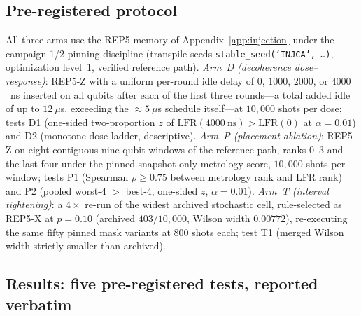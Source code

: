 \documentclass[pdflatex,sn-mathphys-num]{sn-jnl}
\theoremstyle{thmstyleone}
\theoremstyle{thmstyletwo}
\theoremstyle{thmstylethree}
\begin{document}
\subsection{Pre-registered protocol}

All three arms use the REP5 memory of Appendix~\ref{app:injection} under the campaign-1/2 pinning discipline (transpile seeds \texttt{stable\_seed(`INJCA',\,\ldots)}, optimization level~1, verified reference path). \emph{Arm~D (decoherence dose--response)}: REP5-Z with a uniform per-round idle delay of $0$, $1000$, $2000$, or $4000$~ns inserted on all qubits after each of the first three rounds---a total added idle of up to $12~\mu$s, exceeding the $\approx$$5~\mu$s schedule itself---at $10{,}000$ shots per dose; tests D1 (one-sided two-proportion $z$ of $\mathrm{LFR}(4000~\mathrm{ns})>\mathrm{LFR}(0)$ at $\alpha=0.01$) and D2 (monotone dose ladder, descriptive). \emph{Arm~P (placement ablation)}: REP5-Z on eight contiguous nine-qubit windows of the reference path, ranks $0$--$3$ and the last four under the pinned snapshot-only metrology score, $10{,}000$ shots per window; tests P1 (Spearman $\rho\ge0.75$ between metrology rank and LFR rank) and P2 (pooled worst-4 $>$ best-4, one-sided $z$, $\alpha=0.01$). \emph{Arm~T (interval tightening)}: a $4\times$ re-run of the widest archived stochastic cell, rule-selected as REP5-X at $p=0.10$ (archived $403/10{,}000$, Wilson width $0.00772$), re-executing the same fifty pinned mask variants at $800$ shots each; test T1 (merged Wilson width strictly smaller than archived).

\subsection{Results: five pre-registered tests, reported verbatim}
\end{document}
